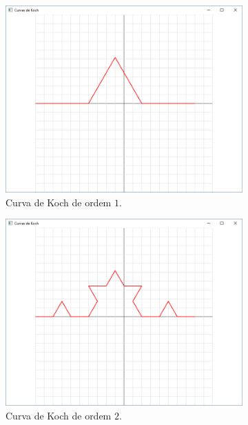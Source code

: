 \begin{renumerate}
\begin{enumerate}[label=(\alph*)]
          \begin{figure}[H]
          \centering
          \begin{subfigure}[t]{0.3\textwidth}
              \centerline{\includegraphics[width=.9\textwidth]{img/cap4_ex14}}
              \caption{Curva de Koch de ordem $1$.}
              \label{fig:cap03_ex14a}
          \end{subfigure}
          \hfill
          \begin{subfigure}[t]{0.3\textwidth}
              \centerline{\includegraphics[width=.9\textwidth]{img/cap4_ex14b}}
              \caption{Curva de Koch de ordem $2$.}
              \label{fig:cap03_ex14b}
          \end{subfigure}
          \hfill
          \begin{subfigure}[t]{0.3\textwidth}

\end{subfigure}
\end{figure}
\end{enumerate}
\end{renumerate}
